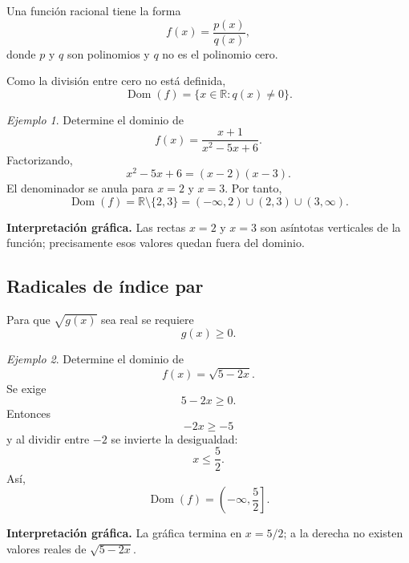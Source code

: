 \documentclass[12pt]{article}
\theoremstyle{remark}
\newtheorem{ejemplo}{Ejemplo}[section]
\newcommand{\R}{\mathbb{R}}
\newcommand{\Dom}{\operatorname{Dom}}
\begin{document}
Una función racional tiene la forma
\[
f(x)=\frac{p(x)}{q(x)},
\]
donde $p$ y $q$ son polinomios y $q$ no es el polinomio cero.

Como la división entre cero no está definida,
\[
\Dom(f)=\{x\in\R:q(x)\neq0\}.
\]

\begin{ejemplo}
Determine el dominio de
\[
f(x)=\frac{x+1}{x^2-5x+6}.
\]
Factorizando,
\[
x^2-5x+6=(x-2)(x-3).
\]
El denominador se anula para $x=2$ y $x=3$. Por tanto,
\[
\Dom(f)=\R\setminus\{2,3\}
=(-\infty,2)\cup(2,3)\cup(3,\infty).
\]

\textbf{Interpretación gráfica.} Las rectas $x=2$ y $x=3$ son asíntotas
verticales de la función; precisamente esos valores quedan fuera del dominio.
\begin{center}
\end{center}
\end{ejemplo}

\subsection*{Radicales de índice par}

Para que $\sqrt{g(x)}$ sea real se requiere
\[
g(x)\geq0.
\]

\begin{ejemplo}
Determine el dominio de
\[
f(x)=\sqrt{5-2x}.
\]
Se exige
\[
5-2x\geq0.
\]
Entonces
\[
-2x\geq-5
\]
y al dividir entre $-2$ se invierte la desigualdad:
\[
x\leq\frac52.
\]
Así,
\[
\Dom(f)=\left(-\infty,\frac52\right].
\]

\textbf{Interpretación gráfica.} La gráfica termina en $x=5/2$; a la derecha
no existen valores reales de $\sqrt{5-2x}$.
\begin{center}
\end{center}
\end{ejemplo}
\end{document}
